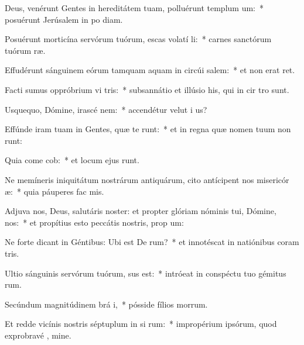 \item Deus, venérunt Gentes in hereditátem tuam, polluérunt templum  um:~* posuérunt Jerúsalem in po diam.
\item Posuérunt morticína servórum tuórum, escas volatí li:~* carnes sanctórum tuórum  ræ.
\item Effudérunt sánguinem eórum tamquam aquam in circúi salem:~* et non erat  ret.
\item Facti sumus oppróbrium vi tris:~* subsannátio et illúsio his, qui in cir tro sunt.
\item Usquequo, Dómine, irascé  nem:~* accendétur velut i  us?
\item Effúnde iram tuam in Gentes, quæ te  runt:~* et in regna quæ nomen tuum non runt:
\item Quia come cob:~* et locum ejus runt.
\item Ne memíneris iniquitátum nostrárum antiquárum, cito antícipent nos misericór æ:~* quia páuperes fac  mis.
\item Adjuva nos, Deus, salutáris noster: et propter glóriam nóminis tui, Dómine,  nos:~* et propítius esto peccátis nostris, prop  um:
\item Ne forte dicant in Géntibus: Ubi est De rum?~* et innotéscat in natiónibus coram  tris.
\item Ultio sánguinis servórum tuórum,  sus est:~* intróeat in conspéctu tuo gémitus rum.
\item Secúndum magnitúdinem brá i,~* pósside fílios morrum.
\item Et redde vicínis nostris séptuplum in si rum:~* impropérium ipsórum, quod exprobravé , mine.
